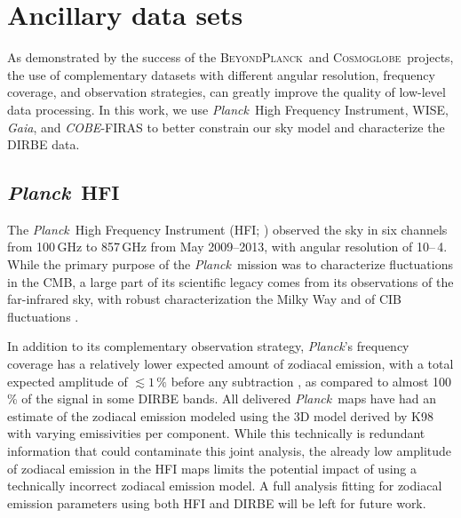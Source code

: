 \documentclass{aa}
\def\Planck{\textit{Planck}}
\def\COBE{\textit{COBE}}
\def\GAIA{\textit{Gaia}}
\def\WISE{WISE}
\newcommand{\bp}{\textsc{BeyondPlanck}}
\newcommand{\cosmoglobe}{\textsc{Cosmoglobe}}
\begin{document}



\section{Ancillary data sets}
\label{sec:ancillary}

As demonstrated by the success of the \bp\ and \cosmoglobe\ projects, the use of complementary datasets with different angular resolution, frequency coverage, and observation strategies, can greatly improve the quality of low-level data processing. In this work, we use \Planck\ High Frequency Instrument, \WISE, \GAIA, and \COBE-FIRAS to better constrain our sky model and characterize the DIRBE data.


\subsection{\Planck\ HFI}


The \Planck\ High Frequency Instrument (HFI; \citealt{planck2016-l03}) observed the sky in six channels from 100\,GHz to 857\,GHz from May 2009--2013, with angular resolution of 10\arcm--\,4\arcm. While the primary purpose of the \Planck\ mission was to characterize fluctuations in the CMB, a large part of its scientific legacy comes from its observations of the far-infrared sky, with robust characterization the Milky Way \citep{planck2013-XVII,planck2014-a12,planck2016-l03} and of CIB fluctuations \citep{planck2014-a12,planck2013-XVII,lenz2019,mccarthy:2024}.

In addition to its complementary observation strategy, \Planck's frequency coverage has a relatively lower expected amount of zodiacal emission, with a total expected amplitude of $\lesssim1\,\%$ before any subtraction \citep{maris2006c,planck2013-pip88}, as compared to almost 100\,\% of the signal in some DIRBE bands. All delivered \Planck\ maps have had an estimate of the zodiacal emission modeled using the 3D model derived by K98 with varying emissivities per component. While this technically is redundant information that could contaminate this joint analysis, the already low amplitude of zodiacal emission in the HFI maps limits the potential impact of using a technically incorrect zodiacal emission model. A full analysis fitting for zodiacal emission parameters using both HFI and DIRBE will be left for future work.
\end{document}

